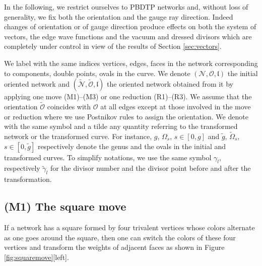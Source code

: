 \documentclass[11pt]{amsart}
\theoremstyle{plain}
\numberwithin{equation}{section}
\begin{document}
In the following, we restrict ourselves to PBDTP networks and, without loss of generality, we fix both the orientation and the gauge ray direction. Indeed changes of orientation or of gauge direction produce effects on both the system of vectors, the edge wave functions and the vacuum and dressed divisors which are completely under control in view of the results of Section \ref{sec:vectors}.

We label with the same indices vertices, edges, faces in the network corresponding to components, double points, ovals in the curve. We denote $({\mathcal N}, \mathcal O, \mathfrak l)$ the initial oriented 
network and $({\tilde {\mathcal N}}, {\tilde{\mathcal O}}, \mathfrak l)$ the oriented network obtained from it by applying one move (M1)--(M3) or one reduction 
(R1)--(R3). We assume that the orientation ${\tilde {\mathcal O}}$ coincides with $\mathcal O$ at all edges except at those involved in the move or reduction where we use Postnikov rules to assign the orientation. We denote with the same symbol and a tilde any quantity referring to the transformed network or the transformed curve. For instance, $g$, $\Omega_s$, $s\in [0, g]$ and ${\tilde g}$, ${\tilde \Omega}_s$, $s\in [0, {\tilde g}]$ respectively denote the genus and the ovals in the initial and transformed curves. 
To simplify notations, we use the same symbol $\gamma_l$, respectively ${\tilde \gamma}_l$ for the divisor number and the divisor point before and after the transformation.

\subsection{(M1) The square move}\label{sec:square} 


If a network has a square formed by four trivalent vertices
whose colors alternate as one goes around the square, then one can switch the colors of these
four vertices and transform the weights of adjacent faces as shown in Figure \ref{fig:squaremove}[left].
\end{document}
